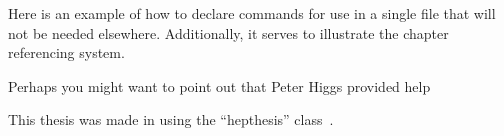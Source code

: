 \DeclareRobustCommand{\personPH}{Peter Higgs\xspace}

Here is an example of how to declare commands for use in a single file that will not be needed elsewhere.
Additionally, it serves to illustrate the chapter referencing system.

Perhaps you might want to point out that \personPH provided help

This thesis was made in \LaTeXe{} using the ``hepthesis'' class~\cite{Buckley:2010:hepthesis}.